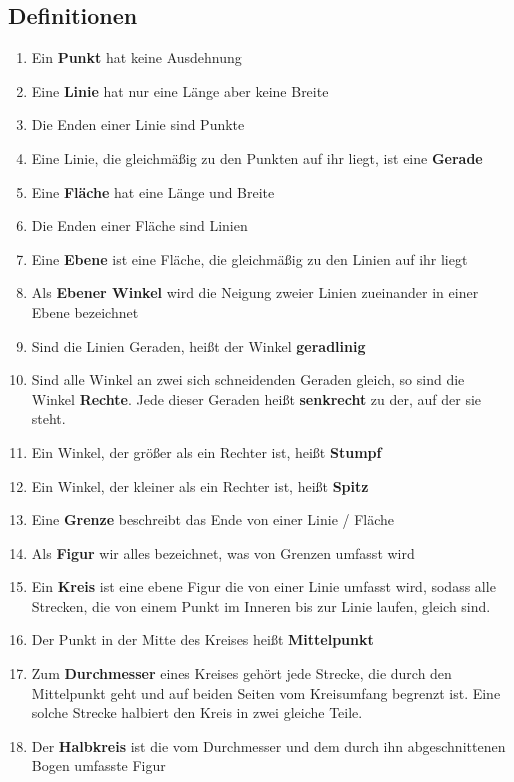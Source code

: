 \documentclass[a4paper]{article}
\begin{document}
	\subsection{Definitionen}
	\begin{enumerate}
		\item Ein \textbf{Punkt} hat keine Ausdehnung
		\item Eine \textbf{Linie} hat nur eine Länge aber keine Breite
		\item Die Enden einer Linie sind Punkte
		\item Eine Linie, die gleichmäßig zu den Punkten auf ihr liegt, ist eine \textbf{Gerade}
		\item Eine \textbf{Fläche} hat eine Länge und Breite
		\item Die Enden einer Fläche sind Linien
		\item Eine \textbf{Ebene} ist eine Fläche, die gleichmäßig zu den Linien auf ihr liegt
		\item Als \textbf{Ebener Winkel} wird die Neigung zweier Linien zueinander in einer Ebene bezeichnet
		\item Sind die Linien Geraden, heißt der Winkel \textbf{geradlinig}
		\item Sind alle Winkel an zwei sich schneidenden Geraden gleich, so sind die Winkel \textbf{Rechte}. Jede dieser Geraden heißt \textbf{senkrecht} zu der, auf der sie steht.
		\item Ein Winkel, der größer als ein Rechter ist, heißt \textbf{Stumpf}
		\item Ein Winkel, der kleiner als ein Rechter ist, heißt \textbf{Spitz}
		\item Eine \textbf{Grenze} beschreibt das Ende von einer Linie / Fläche
		\item Als \textbf{Figur} wir alles bezeichnet, was von Grenzen umfasst wird
		\item Ein \textbf{Kreis} ist eine ebene Figur die von einer Linie umfasst wird, sodass alle Strecken, die von einem Punkt im Inneren bis zur Linie laufen, gleich sind.
		\item  Der Punkt in der Mitte des Kreises heißt \textbf{Mittelpunkt}
		\item Zum \textbf{Durchmesser} eines Kreises gehört jede Strecke, die durch den Mittelpunkt geht und auf beiden Seiten vom Kreisumfang begrenzt ist. Eine solche Strecke halbiert den Kreis in zwei gleiche Teile.
		\item Der \textbf{Halbkreis} ist die vom Durchmesser und dem durch ihn abgeschnittenen Bogen umfasste Figur

\end{enumerate}
\end{document}
